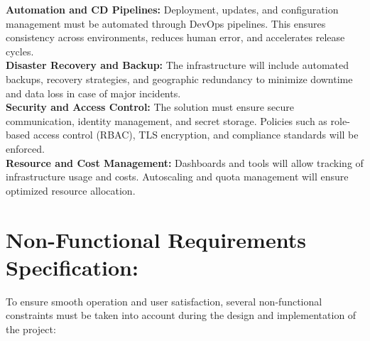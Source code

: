 \documentclass[a4paper,12pt]{report}
\begin{document}
\textbf{Automation and CD Pipelines:}  
Deployment, updates, and configuration management must be automated through DevOps pipelines. This ensures consistency across environments, reduces human error, and accelerates release cycles. \\

\textbf{Disaster Recovery and Backup:}  
The infrastructure will include automated backups, recovery strategies, and geographic redundancy to minimize downtime and data loss in case of major incidents. \\

\textbf{Security and Access Control:}  
The solution must ensure secure communication, identity management, and secret storage. Policies such as role-based access control (RBAC), TLS encryption, and compliance standards will be enforced. \\

\textbf{Resource and Cost Management:}  
Dashboards and tools will allow tracking of infrastructure usage and costs. Autoscaling and quota management will ensure optimized resource allocation. \\


\section{Non-Functional Requirements Specification:}
To ensure smooth operation and user satisfaction, several non-functional constraints must be taken into account during the design and implementation of the project: \\
\end{document}
